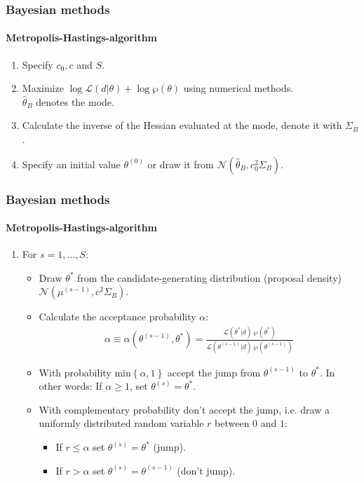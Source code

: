 \documentclass[handout]{beamer}  %
\newcounter{saveenumi}
\newcommand{\seti}{\setcounter{saveenumi}{\value{enumi}}}
\newcommand{\conti}{\setcounter{enumi}{\value{saveenumi}}}
\begin{document}
\begin{frame}\frametitle{Bayesian methods}\framesubtitle{Metropolis-Hastings-algorithm}
\begin{enumerate}
\item Specify $c_0,c$ and $S$.
  \item Maximize $\log{\mathcal{L}({d}|{\theta})} +
      \log{\wp({\theta})}$ using numerical methods.\\
      ${\widehat{\theta}_B}$ denotes the mode.
  \item Calculate the inverse of the Hessian evaluated at the mode, denote it with ${\Sigma_B}$.
  \item Specify an initial value ${\theta^{(0)}}$ or draw it from
      $\mathcal{N}({\widehat{\theta}_B},c_0^2{\Sigma_B})$.
\seti
\end{enumerate}

\end{frame}


\begin{frame}\frametitle{Bayesian methods}\framesubtitle{Metropolis-Hastings-algorithm}
\begin{enumerate}\conti
  \item For ${s}=1,\dots,S$:
  \begin{itemize}
    \item Draw ${\theta^*}$ from the candidate-generating distribution (proposal density)
        $\mathcal{N}({\mu^{(s-1)}},c^2{\Sigma_B})$.
    \item Calculate the acceptance probability $\alpha$:
        \begin{align*}
        \alpha \equiv \alpha\left({\theta^{(s-1)}},{\theta^*}\right) = \frac{\mathcal{L}\left({\theta^{*}}|{d}\right)~\wp\left({\theta^*}\right)}{\mathcal{L}\left({\theta^{(s-1)}}|{d}\right)~\wp\left({\theta^{(s-1)}}\right)}
        \end{align*}
    \item With probability
        $\text{min}\left\{\alpha,1\right\}$ accept the jump from ${\theta^{(s-1)}}$ to ${\theta^*}$.
        In other words: If $\alpha\geq1$, set ${\theta^{(s)}}={\theta^*}$.
    \item With complementary probability don't accept the jump, i.e. draw a uniformly distributed random variable $r$ between $0$ and $1$:
        \begin{itemize}
        \item If $r\leq\alpha$ set ${\theta^{(s)}}={\theta^*}$ (jump).
        \item If $r>\alpha$ set ${\theta^{(s)}}={\theta^{(s-1)}}$ (don't jump).
         \end{itemize}
  \end{itemize}
\seti
\end{enumerate}

\end{frame}
\end{document}
